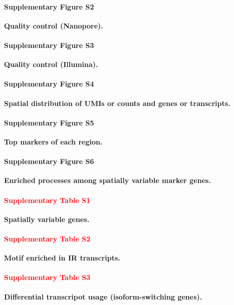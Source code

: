 \documentclass[utf8]{FrontiersinHarvard} %
\newcommand*{\red}{\textcolor{red}}
\begin{document}
\paragraph*{Supplementary Figure S2}
\label{fig:S2}
{\bf Quality control (Nanopore).}

\paragraph*{Supplementary Figure S3}
\label{fig:S3}
{\bf Quality control (Illumina).}

\paragraph*{Supplementary Figure S4}
\label{fig:S4}
{\bf Spatial distribution of UMIs or counts and genes or transcripts.}

\paragraph*{Supplementary Figure S5}
\label{fig:S5}
{\bf Top markers of each region.}

\paragraph*{Supplementary Figure S6}
\label{fig:S6}
{\bf Enriched processes among spatially variable marker genes.}


\paragraph*{\red{Supplementary Table S1}}
\label{tab:tabS1}
{\bf Spatially variable genes.}

\paragraph*{\red{Supplementary Table S2}}
\label{tab:tabS2}
{\bf Motif enriched in IR transcripts.}

\paragraph*{\red{Supplementary Table S3}}
\label{tab:tabS3}
{\bf Differential transcripot usage (isoform-switching genes).}


\end{document}
